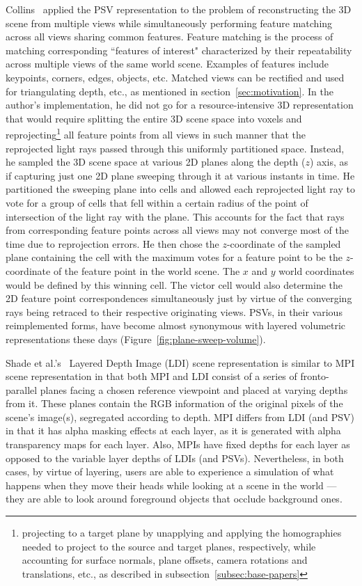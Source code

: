 Collins~\cite{collins_space-sweep_1996} applied the PSV representation to the problem of reconstructing the 3D scene from multiple views while simultaneously performing feature matching across all views sharing common features. Feature matching is the process of matching corresponding ``features of interest" characterized by their repeatability across multiple views of the same world scene. Examples of features include keypoints, corners, edges, objects, etc. Matched views can be rectified and used for triangulating depth, etc., as mentioned in section~\ref{sec:motivation}. In the author's implementation, he did not go for a resource-intensive 3D representation that would require splitting the entire 3D scene space into voxels and reprojecting\footnote{projecting to a target plane by unapplying and applying the homographies needed to project to the source and target planes, respectively, while accounting for surface normals, plane offsets, camera rotations and translations, etc., as described in subsection~\ref{subsec:base-papers}} all feature points from all views in such manner that the reprojected light rays passed through this uniformly partitioned space. Instead, he sampled the 3D scene space at various 2D planes along the depth ($z$) axis, as if capturing just one 2D plane sweeping through it at various instants in time. He partitioned the sweeping plane into cells and allowed each reprojected light ray to vote for a group of cells that fell within a certain radius of the point of intersection of the light ray with the plane. This accounts for the fact that rays from corresponding feature points across all views may not converge most of the time due to reprojection errors. He then chose the $z$-coordinate of the sampled plane containing the cell with the maximum votes for a feature point to be the $z$-coordinate of the feature point in the world scene. The $x$ and $y$ world coordinates would be defined by this winning cell. The victor cell would also determine the 2D feature point correspondences simultaneously just by virtue of the converging rays being retraced to their respective originating views. PSVs, in their various reimplemented forms, have become almost synonymous with layered volumetric representations these days (Figure~\ref{fig:plane-sweep-volume}).

Shade et al.'s~\cite{shade_layered_1998} Layered Depth Image (LDI) scene representation is similar to MPI scene representation in that both MPI and LDI consist of a series of fronto-parallel planes facing a chosen reference viewpoint and placed at varying depths from it. These planes contain the RGB information of the original pixels of the scene's image(s), segregated according to depth. MPI differs from LDI (and PSV) in that it has alpha masking effects at each layer, as it is generated with alpha transparency maps for each layer. Also, MPIs have fixed depths for each layer as opposed to the variable layer depths of LDIs (and PSVs). Nevertheless, in both cases, by virtue of layering, users are able to experience a simulation of what happens when they move their heads while looking at a scene in the world --- they are able to look around foreground objects that occlude background ones. 

